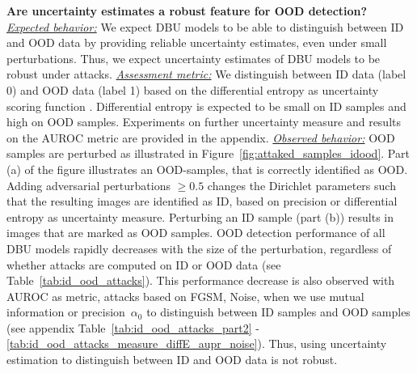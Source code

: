 \textbf{Are uncertainty estimates a robust feature for OOD detection?}\\
%
\underline{\emph{Expected behavior:}} We expect DBU models to be able to distinguish between ID and OOD data by providing reliable uncertainty estimates, even under small perturbations. Thus, we expect uncertainty estimates of DBU models to be robust under attacks. 
%
\underline{\emph{Assessment metric:}} We distinguish between ID data (label 0) and OOD data (label 1) based on the differential entropy as uncertainty scoring function \citep{malini2018}. Differential entropy is expected to be small on ID samples and high on OOD samples. Experiments on further uncertainty measure and results on the AUROC metric are provided in the appendix. 
%
\underline{\emph{Observed behavior:}} OOD samples are perturbed as illustrated in  Figure~\ref{fig:attaked_samples_idood}. Part (a) of the figure illustrates an OOD-samples, that is correctly identified as OOD. Adding adversarial perturbations $\geq 0.5$ changes the Dirichlet parameters such that the resulting images are identified as ID, based on precision or differential entropy as uncertainty measure. Perturbing an ID sample (part (b)) results in images that are marked as OOD samples. 
OOD detection performance of all DBU models rapidly decreases with the size of the perturbation, regardless of whether attacks are computed on ID or OOD data (see Table~\ref{tab:id_ood_attacks}). This performance decrease is also observed with AUROC as metric, attacks based on FGSM, Noise, when we use mutual information or precision~$\alpha_0$ to distinguish between ID samples and OOD samples (see appendix Table~\ref{tab:id_ood_attacks_part2} - \ref{tab:id_ood_attacks_measure_diffE_aupr_noise}). 
Thus, using uncertainty estimation to distinguish between ID and OOD data is not robust. 



